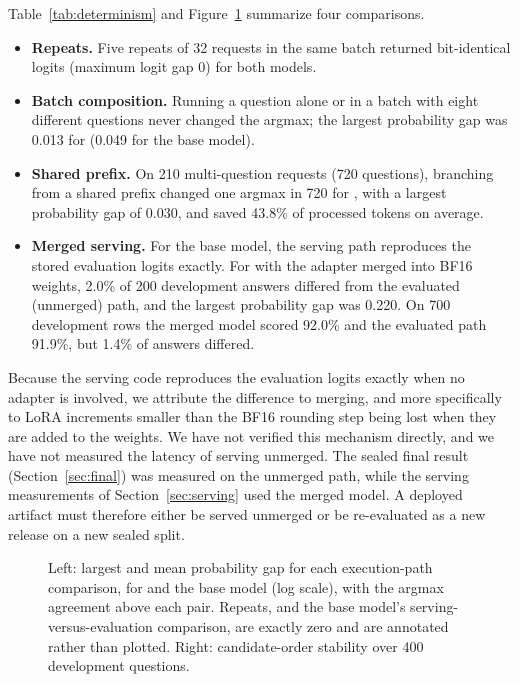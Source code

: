 Table~\ref{tab:determinism} and Figure~\ref{fig:fixedness} summarize four comparisons.
\begin{itemize}
  \item \textbf{Repeats.} Five repeats of 32 requests in the same batch returned
    bit-identical logits (maximum logit gap 0) for both models.
  \item \textbf{Batch composition.} Running a question alone or in a batch with eight
    different questions never changed the argmax; the largest probability gap was 0.013 for
    \expone{} (0.049 for the base model).
  \item \textbf{Shared prefix.} On 210 multi-question requests (720 questions), branching
    from a shared prefix changed one argmax in 720 for \expone{}, with a largest probability
    gap of 0.030, and saved 43.8\% of processed tokens on average.
  \item \textbf{Merged serving.} For the base model, the serving path reproduces the stored
    evaluation logits exactly. For \expone{} with the adapter merged into BF16 weights, 2.0\%
    of 200 development answers differed from the evaluated (unmerged) path, and the largest
    probability gap was 0.220. On 700 development rows the merged model scored 92.0\% and the
    evaluated path 91.9\%, but 1.4\% of answers differed.
\end{itemize}
Because the serving code reproduces the evaluation logits exactly when no adapter is
involved, we attribute the difference to merging, and more specifically to LoRA increments
smaller than the BF16 rounding step being lost when they are added to the weights. We have
not verified this mechanism directly, and we have not measured the latency of serving
\expone{} unmerged. The sealed final result
(Section~\ref{sec:final}) was measured on the unmerged path, while the serving measurements of
Section~\ref{sec:serving} used the merged model. A deployed artifact must therefore either be
served unmerged or be re-evaluated as a new release on a new sealed split.

\begin{figure}[t]
\centering
{}
\caption{Left: largest and mean probability gap for each execution-path comparison, for
\expone{} and the base model (log scale), with the argmax agreement above each pair. Repeats,
and the base model's serving-versus-evaluation comparison, are exactly zero and are annotated
rather than plotted. Right: candidate-order stability over 400 development questions.}
\label{fig:fixedness}
\end{figure}

